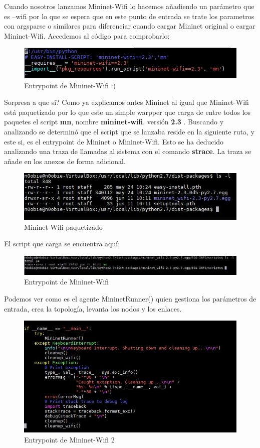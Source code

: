 \newline
Cuando nosotros lanzamos Mininet-Wifi lo hacemos añadiendo un parámetro que es --wifi por lo que se espera que en este punto de entrada se trate los parametros con argsparse o similares para diferenciar cuando cargar Mininet original o cargar Mininet-Wifi. Accedemos al código para comprobarlo:\newpage
\begin{figure}[!htb]
  \centering
    \includegraphics[width=0.8\linewidth]{./img/util/3.JPG}
    \caption{Entrypoint de Mininet-Wifi :)}
  \label{fig:yo}
\end{figure}
Sorpresa a que si? Como ya explicamos antes Mininet al igual que Mininet-Wifi está paquetizado por lo que este un simple warpper que carga de entre todos los paquetes el script \textbf{mn}, nombre \textbf{mininet-wifi}, versión \textbf{2.3} . \newline
\newline
Buscando y analizando se determinó que el script que se lanzaba reside en la siguiente ruta, y este si,  es el entrypoint de Mininet o Mininet-Wifi. Esto se ha deducido analizando una traza de llamadas al sistema con el comando \textbf{strace}. La traza se añade en los anexos de forma adicional.
\begin{figure}[!htb]
  \centering
    \includegraphics[width=0.8\linewidth]{./img/util/4.JPG}
    \caption{Mininet-Wifi paquetizado}
  \label{fig:yo}
\end{figure}
El script que carga se encuentra aquí:
\begin{figure}[!htb]
  \centering
    \includegraphics[width=\linewidth]{./img/util/5.JPG}
    \caption{Entrypoint de Mininet-Wifi}
  \label{fig:yo}
\end{figure}
\newline
Podemos ver como es el agente MininetRunner() quien gestiona los parámetros de entrada, crea la topología, levanta los nodos y los enlaces.
\begin{figure}[!htb]
  \centering
    \includegraphics[width=0.8\linewidth]{./img/util/6.JPG}
    \caption{Entrypoint de Mininet-Wifi 2}
  \label{fig:yo}
\end{figure}

